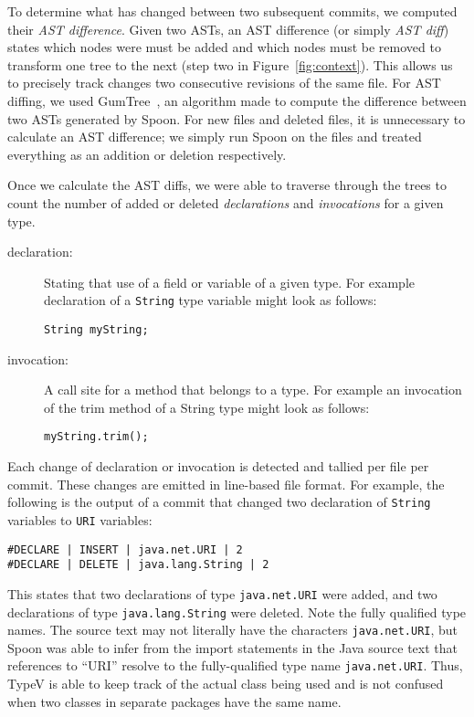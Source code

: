 To determine what has changed between two subsequent commits, we computed their \emph{AST difference}. Given two ASTs, an AST difference (or simply \emph{AST diff}) states which nodes were must be added and which nodes must be removed to transform one tree to the next (step two in Figure~\ref{fig:context}). This allows us to precisely track changes two consecutive revisions of the same file. For AST diffing, we used GumTree~\cite{falleri:hal-01054552}, an algorithm made to compute the difference between two ASTs generated by Spoon. For new files and deleted files, it is unnecessary to calculate an AST difference; we simply run Spoon on the files and treated everything as an addition or deletion respectively.

Once we calculate the AST diffs, we were able to traverse through the trees to count the number of added or deleted \emph{declarations} and \emph{invocations} for a given type.

\begin{description}
\item [declaration:]
  Stating that use of a field or variable of a given type. For example declaration of a \texttt{String} type variable might look as follows:
  \\
  \begin{adjustwidth}{2.5em}{0pt}
  \texttt{String myString;} \\
  \end{adjustwidth}
\item [invocation:]
  A call site for a method that belongs to a type. For example an invocation of the trim method of a String type might look as follows:
  \\
  \begin{adjustwidth}{2.5em}{0pt}
  \texttt{myString.trim();} \\
  \end{adjustwidth}
\end{description}

Each change of declaration or invocation is detected and tallied per file per commit. These changes are emitted in line-based file format. For example, the following is the output of a commit that changed two declaration of \texttt{String} variables to \texttt{URI} variables:

\begin{verbatim}
#DECLARE | INSERT | java.net.URI | 2
#DECLARE | DELETE | java.lang.String | 2
\end{verbatim}

This states that two declarations of type \texttt{java.net.URI} were added, and two declarations of type \texttt{java.lang.String} were deleted. Note the fully qualified type names. The source text may not literally have the characters \texttt{java.net.URI}, but Spoon was able to infer from the import statements in the Java source text that references to ``URI'' resolve to the fully-qualified type name \texttt{java.net.URI}. Thus, TypeV is able to keep track of the actual class being used and is not confused when two classes in separate packages have the same name.

